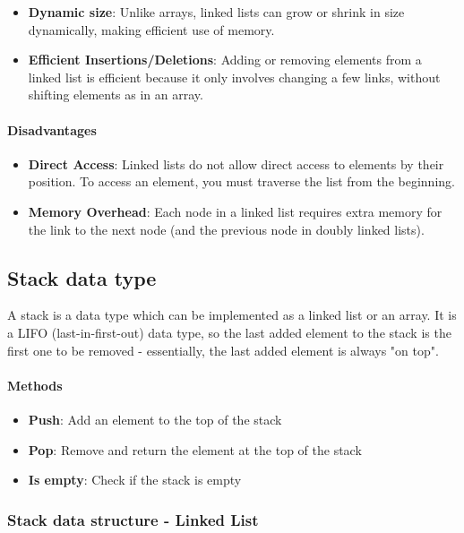 \documentclass{article}
\begin{document}
\begin{itemize}
    \item \textbf{Dynamic size}: Unlike arrays, linked lists can grow or shrink in size dynamically, making efficient use of memory.
    \item \textbf{Efficient Insertions/Deletions}: Adding or removing elements from a linked list is efficient because it only involves changing a few links, without shifting elements as in an array.
\end{itemize}

\paragraph{Disadvantages}

\begin{itemize}
    \item \textbf{Direct Access}: Linked lists do not allow direct access to elements by their position. To access an element, you must traverse the list from the beginning.
    \item \textbf{Memory Overhead}: Each node in a linked list requires extra memory for the link to the next node (and the previous node in doubly linked lists).
\end{itemize}

\subsection{Stack data type}

A stack is a data type which can be implemented as a linked list or an array. It is a LIFO (last-in-first-out) data type, so the last added element to the stack is the first one to be removed - essentially, the last added element is always "on top".

\paragraph{Methods}
\begin{itemize}
    \item \textbf{Push}: Add an element to the top of the stack
    \item \textbf{Pop}: Remove and return the element at the top of the stack
    \item \textbf{Is empty}: Check if the stack is empty
\end{itemize}

\subsubsection{Stack data structure - Linked List}
\end{document}
